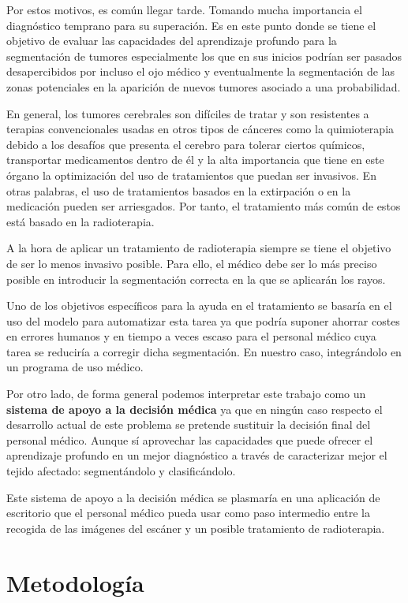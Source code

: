 Por estos motivos, es común llegar tarde. Tomando mucha importancia el diagnóstico temprano para su superación. Es en este punto donde se tiene el objetivo de evaluar las capacidades del aprendizaje profundo para la segmentación de tumores especialmente los que en sus inicios podrían ser pasados desapercibidos por incluso el ojo médico y eventualmente la segmentación de las zonas potenciales en la aparición de nuevos tumores asociado a una probabilidad.

En general, los tumores cerebrales son difíciles de tratar y son resistentes a terapias convencionales usadas en otros tipos de cánceres como la quimioterapia debido a los desafíos que presenta el cerebro para tolerar ciertos químicos, transportar medicamentos dentro de él y la alta importancia que tiene en este órgano la optimización del uso de tratamientos que puedan ser invasivos. En otras palabras, el uso de tratamientos basados en la extirpación o en la medicación pueden ser arriesgados. Por tanto, el tratamiento más común de estos está basado en la radioterapia.

A la hora de aplicar un tratamiento de radioterapia siempre se tiene el objetivo de ser lo menos invasivo posible. Para ello, el médico debe ser lo más preciso posible en introducir la segmentación correcta en la que se aplicarán los rayos. 

Uno de los objetivos específicos para la ayuda en el tratamiento se basaría en el uso del modelo para automatizar esta tarea ya que podría suponer ahorrar costes en errores humanos y en tiempo a veces escaso para el personal médico cuya tarea se reduciría a corregir dicha segmentación. En nuestro caso, integrándolo en un programa de uso médico. 

Por otro lado, de forma general podemos interpretar este trabajo como un \textbf{sistema de apoyo a la decisión médica} ya que en ningún caso respecto el desarrollo actual de este problema se pretende sustituir la decisión final del personal médico. Aunque sí aprovechar las capacidades que puede ofrecer el aprendizaje profundo en un mejor diagnóstico a través de caracterizar mejor el tejido afectado: segmentándolo y clasificándolo.

Este sistema de apoyo a la decisión médica se plasmaría en una aplicación de escritorio que el personal médico pueda usar como paso intermedio entre la recogida de las imágenes del escáner y un posible tratamiento de radioterapia.


\section{Metodología}

